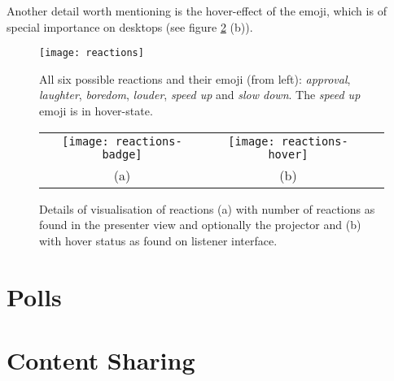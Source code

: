 Another detail worth mentioning is the hover-effect of the emoji, which is of special importance on desktops (see figure \ref{fig:design-reactions-details} (b)).

\begin{figure}
\centering
\texttt{[image: reactions]}
\caption{All six possible reactions and their emoji (from left): \emph{approval}, \emph{laughter}, \emph{boredom}, \emph{louder}, \emph{speed up} and \emph{slow down}. The \emph{speed up} emoji is in hover-state.}
\label{fig:design-reactions}
\end{figure}

\begin{figure}
\centering
\begin{tabular}{ccc}
\texttt{[image: reactions-badge]} &
\texttt{[image: reactions-hover]} \\
(a) & (b)
\end{tabular}
\caption{Details of visualisation of reactions (a) with number of reactions as found in the presenter view and optionally the projector and (b) with hover status as found on listener interface.}
\label{fig:design-reactions-details}
\end{figure}



\section{Polls}

\section{Content Sharing}
